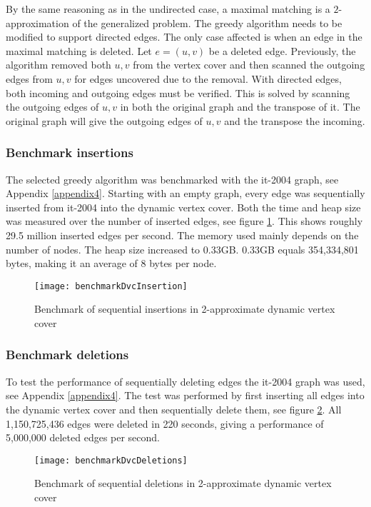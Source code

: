 By the same reasoning as in the undirected case, a maximal matching is a $2$-approximation of the generalized problem. The greedy algorithm needs to be modified to support directed edges. The only case affected is when an edge in the maximal matching is deleted. Let $e = (u,v)$ be a deleted edge. Previously, the algorithm removed both $u,v$ from the vertex cover and then scanned the outgoing edges from $u,v$ for edges uncovered due to the removal. With directed edges, both incoming and outgoing edges must be verified. This is solved by scanning the outgoing edges of $u,v$ in both the original graph and the transpose of it. The original graph will give the outgoing edges of $u,v$ and the transpose the incoming.

\subsubsection{Benchmark insertions}
The selected greedy algorithm was benchmarked with the it-2004 graph, see Appendix \ref{appendix4}. Starting with an empty graph, every edge was sequentially inserted from it-2004 into the dynamic vertex cover. Both the time and heap size was measured over the number of inserted edges, see figure \ref{fig:benchmarkDvcInsertion}. This shows roughly 29.5 million inserted edges per second. The memory used mainly depends on the number of nodes. The heap size increased to 0.33GB. 0.33GB equals 354,334,801 bytes, making it an average of 8 bytes per node. 

\begin{figure}[h]
\centering
\texttt{[image: benchmarkDvcInsertion]}    
\captionsetup{justification=centering}
\caption {Benchmark of sequential insertions in 2-approximate dynamic vertex cover}
\label{fig:benchmarkDvcInsertion}
\end{figure}

\subsubsection{Benchmark deletions}
To test the performance of sequentially deleting edges the it-2004 graph was used, see Appendix \ref{appendix4}. The test was performed by first inserting all edges into the dynamic vertex cover and then sequentially delete them, see figure \ref{fig:benchmarkDvcDeletions}. All 1,150,725,436 edges were deleted in 220 seconds, giving a performance of 5,000,000 deleted edges per second. 

\begin{figure}[h]
\centering
\texttt{[image: benchmarkDvcDeletions]}    
\captionsetup{justification=centering}
\caption {Benchmark of sequential deletions in 2-approximate dynamic vertex cover}
\label{fig:benchmarkDvcDeletions}
\end{figure}

